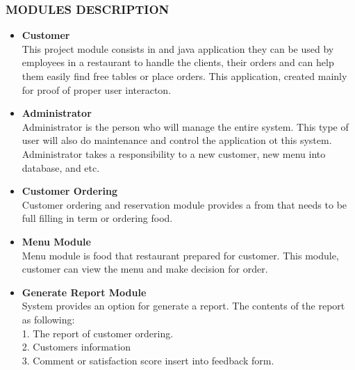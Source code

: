 \documentclass[12pt,a4paper]{article}
\begin{document}
		\subsubsection{MODULES DESCRIPTION}
		\begin{itemize}
			\item {\bfseries Customer} \\
                        This project module consists in and java application they can be used by employees in a restaurant to handle the clients, their orders and can help them easily find free tables or place orders. This application, created mainly for proof of proper user interacton.
                        \item {\bfseries Administrator} \\
                        Administrator is the person who will manage the entire system. This type of user will also do maintenance and control the application ot this system. Administrator takes a responsibility to a new customer, new menu into database, and etc.
                        \item {\bfseries Customer Ordering} \\
                        Customer ordering and reservation module provides a from that needs to be full filling in term or ordering food.
                        \item {\bfseries Menu Module } \\
                        Menu module is food that restaurant prepared for customer. This module, customer can view the menu and make decision for order.
                        \item {\bfseries Generate Report Module} \\
                        System provides an option for generate a report. The contents of the report as following: \\
                        1. The report of customer ordering. \\
                        2. Customers information \\
                        3. Comment or satisfaction score insert into feedback form.     

		\end{itemize}
\end{document}
